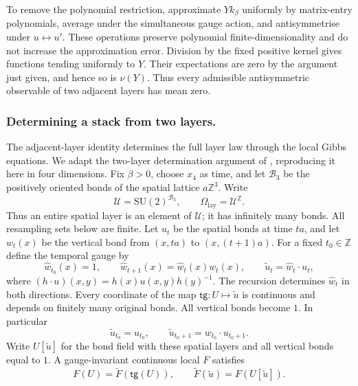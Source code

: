 \documentclass[11pt,letterpaper,reqno]{amsart}
\theoremstyle{definition}
\theoremstyle{remark}
\newcommand{\SU}{\mathrm{SU}}
\begin{document}
To remove the polynomial restriction, approximate $Yk_\beta$
uniformly by matrix-entry polynomials, average under the simultaneous
gauge action, and antisymmetrise under $u\leftrightarrow u'$. These
operations preserve polynomial finite-dimensionality and do not
increase the approximation error. Division by the fixed positive
kernel gives functions tending uniformly to $Y$. Their expectations
are zero by the argument just given, and hence so is $\nu(Y)$.
Thus every admissible antisymmetric observable of two adjacent layers
has mean zero.

\subsubsection*{Determining a stack from two layers.}
The adjacent-layer identity determines the full layer law through the
local Gibbs equations. We adapt the two-layer determination argument of
\cite[Lemma~103.2]{YMCompanion},
reproducing it here in four dimensions. Fix $\beta>0$,
choose $x_4$ as time, and let $\mathcal B_3$ be the positively oriented
bonds of the spatial lattice $a\mathbb Z^3$. Write
\[
 \mathcal U=\SU(2)^{\mathcal B_3},\qquad
 \Omega_{\mathrm{lay}}=\mathcal U^{\mathbb Z}.
\]
Thus an entire spatial layer is an element of $\mathcal U$; it has
infinitely many bonds. All resampling sets below are finite.
Let $u_t$ be the spatial bonds at time $ta$, and let $w_t(x)$ be the
vertical bond from $(x,ta)$ to $(x,(t+1)a)$. For a fixed $t_0\in\mathbb Z$
define the temporal gauge by
\[
 \widehat w_{t_0}(x)=1,\qquad
 \widehat w_{t+1}(x)=\widehat w_t(x)w_t(x),\qquad
 \widetilde u_t=\widehat w_t\cdot u_t,
\]
where $(h\cdot u)(x,y)=h(x)u(x,y)h(y)^{-1}$. The recursion determines
$\widehat w_t$ in both directions. Every coordinate of the map
$\mathsf{tg}:U\mapsto\widetilde u$ is continuous and depends on
finitely many original bonds. All vertical bonds become $1$.
In particular
\[
 \widetilde u_{t_0}=u_{t_0},\qquad
 \widetilde u_{t_0+1}=w_{t_0}\cdot u_{t_0+1}.
\]
Write $U[\widetilde u]$ for the bond field with these spatial layers
and all vertical bonds equal to $1$. A gauge-invariant continuous
local $F$ satisfies
\[
 F(U)=\widetilde F(\mathsf{tg}(U)),\qquad
 \widetilde F(\widetilde u)=F(U[\widetilde u]).
\]
\end{document}
